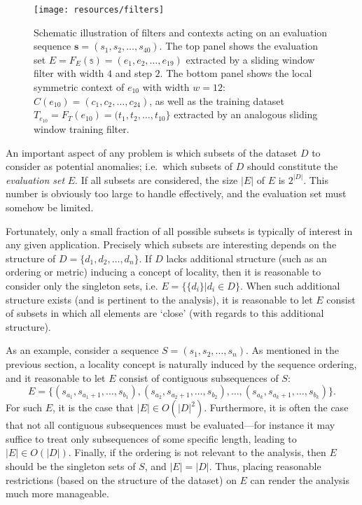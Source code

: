 \begin{figure}[htb]
    \begin{center}
        \texttt{[image: resources/filters]}
    \end{center}
\caption{{\small Schematic illustration of filters and contexts acting on an evaluation sequence $\mathbf{s} = (s_1, s_2, \dots, s_{40})$. The top panel shows the evaluation set $E = F_E(\mathbb{s}) = (e_1, e_2, \dots, e_{19})$ extracted by a sliding window filter with width $4$ and step $2$. The bottom panel shows the local symmetric context of $e_{10}$ with width $w = 12$: $C(e_{10}) = (c_1, c_2, \dots, c_{24})$, as well as the training dataset $T_{e_{10}} = F_T(e_{10}) = (t_1, t_2, \dots, t_{10}\}$ extracted by an analogous sliding window training filter.}}
\label{fig:filters}
\end{figure}

An important aspect of any problem is which subsets of the dataset $D$ to consider as potential anomalies; i.e.\ which subsets of $D$ should constitute the \emph{evaluation set} $E$. If all subsets are considered, the size $|E|$ of $E$ is $2^{|D|}$. This number is obviously too large to handle effectively, and the evaluation set must somehow be limited.

Fortunately, only a small fraction of all possible subsets is typically of interest in any given application. Precisely which subsets are interesting depends on the structure of $D = \{d_1, d_2, \dots, d_n\}$. If $D$ lacks additional structure (such as an ordering or metric) inducing a concept of locality, then it is reasonable to consider only the singleton sets, i.e. $E = \{\{d_i\} | d_i \in D\}$. When such additional structure exists (and is pertinent to the analysis), it is reasonable to let $E$ consist of subsets in which all elements are `close' (with regards to this additional structure).

As an example, consider a sequence $S = (s_1, s_2, \dots, s_n)$. As mentioned in the previous section, a locality concept is naturally induced by the sequence ordering, and it reasonable to let $E$ consist of contiguous subsequences of $S$:
\[
    E = \{(s_{a_1}, s_{a_1 + 1}, \dots , s_{b_1}) , (s_{a_2}, s_{a_2 +1}, \dots, s_{b_2}), \dots, (s_{a_k}, s_{a_k+1}, \dots, s_{b_k})\}.
\]
For such $E$, it is the case that $|E| \in O(|D|^2)$. Furthermore, it is often the case that not all contiguous subsequences must be evaluated---for instance it may suffice to treat only subsequences of some specific length, leading to $|E| \in O(|D|)$. Finally, if the ordering is not relevant to the analysis, then $E$ should be the singleton sets of $S$, and $|E| = |D|$. Thus, placing reasonable restrictions (based on the structure of the dataset) on $E$ can render the analysis much more manageable.

